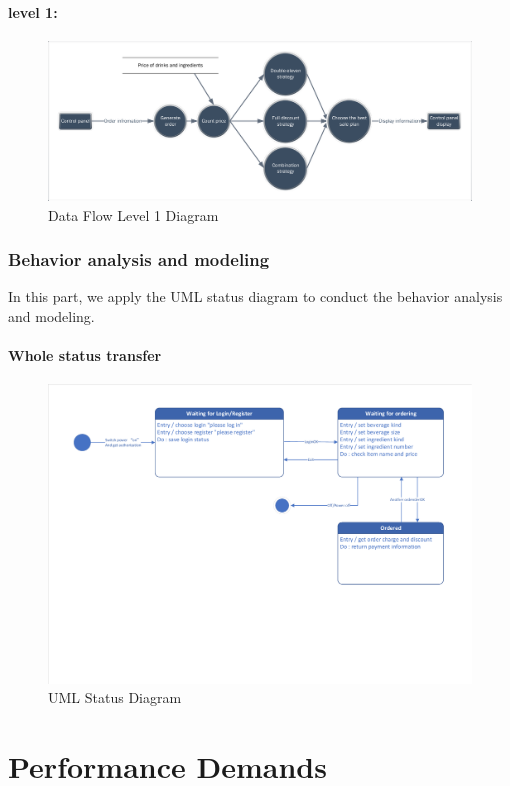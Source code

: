 \documentclass[a4paper]{report}
\begin{document}
\subsubsection{level 1:}
\begin{figure}
  \centering
  \includegraphics[scale=0.38]{DataFlowLevel1.pdf}
  \caption{Data Flow Level 1 Diagram}\label{6}
\end{figure}

\subsection{Behavior analysis and modeling}
In this part, we apply the UML status diagram to conduct the behavior analysis and modeling.
\subsubsection{Whole status transfer}
\begin{figure}
  \centering
  \includegraphics[scale=0.38]{statusDiagram.pdf}
  \caption{UML Status Diagram}\label{7}
\end{figure}
\chapter{Performance Demands}
\end{document}
